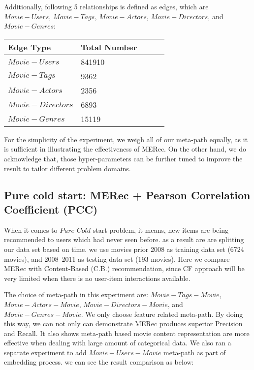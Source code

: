 Additionally, following 5 relationships is defined as edges, which are $Movie-Users$, $Movie-Tags$, $Movie-Actors$, $Movie-Directors$, and $Movie-Genres$:

\begin{center}
    \begin{tabular}{|l|l|l|l|l|}
    \hline
     \textbf{Edge Type} & \textbf{Total Number} \\ \hline
     $Movie-Users$ &  841910\\ \hline
     $Movie-Tags$ &   9362 \\ \hline
     $Movie-Actors$ &  2356 \\ \hline
     $Movie-Directors$ &  6893 \\ \hline
     $Movie-Genres$ &  15119 \\ \hline
    \end{tabular}
\end{center}

For the simplicity of the experiment, we weigh all of our meta-path equally, as it is sufficient in illustrating the effectiveness of MERec. On the other hand, we do acknowledge that, those hyper-parameters can be further tuned to improve the result to tailor different problem domains. 


\subsection{Pure cold start: MERec + Pearson Correlation Coefficient (PCC)}
When it comes to $Pure$ $Cold$ start problem, it means, new items are being recommended to users which had never seen before. as a result are are splitting our data set based on time.
we use movies prior 2008 as training data set (6724 movies), and 2008~2011 as testing data set (193 movies). Here we compare MERec with Content-Based (C.B.) recommendation, since CF approach will be very limited when there is no user-item interactions available.

The choice of meta-path in this experiment are: $Movie-Tags-Movie$, $Movie-Actors-Movie$, $Movie-Directors-Movie$, and $Movie-Genres-Movie$. We only choose feature related meta-path. By doing this way, we can not only can demonstrate MERec produces superior Precision and Recall. It also shows meta-path based movie content representation are more effective when dealing with large amount of categorical data. 
We also ran a separate experiment to add $Movie-Users-Movie$ meta-path as part of embedding process. we can see the result comparison as below:


